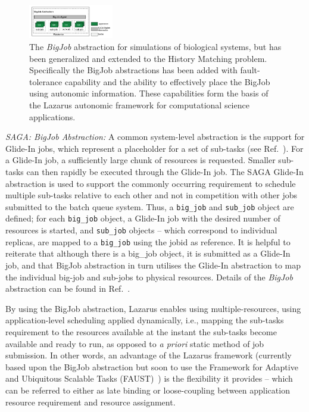 \documentclass{sig-alternate}
\newcommand{\up}{\vspace*{-0.3em}}
\begin{document}
\begin{figure}[t]
      \centering
      \includegraphics[width=0.330\textwidth]{./figures/enkf_bigjob.pdf}
      \caption{\footnotesize The {\it BigJob} abstraction for simulations of
        biological systems, but has been generalized and extended to
        the History Matching problem. Specifically the BigJob
        abstractions has been added with fault-tolerance capability
        and the ability to effectively place the BigJob using
        autonomic information. These capabilities form the basis of
        the Lazarus autonomic framework for computational science
        applications.}
      \label{fig:abstractions}\up\up\up \up\up\up
\end{figure}

{\it SAGA: BigJob Abstraction:} A common system-level abstraction is
the support for Glide-In jobs, which represent a placeholder for a
set of sub-tasks (see Ref.~\cite{saga_royalsoc}).  For a Glide-In
job, a sufficiently large chunk of resources is requested. Smaller
sub-tasks can then rapidly be executed through the Glide-In job.
The SAGA Glide-In abstraction is used to support the commonly
occurring requirement to schedule multiple sub-tasks relative to each
other and not in competition with other jobs submitted to the batch
queue system.  Thus, a \texttt{big\_job} and \texttt{sub\_job} object
are defined; for each \texttt{big\_job} object, a Glide-In job with
the desired number of resources is started, and \texttt{sub\_job}
objects -- which correspond to individual replicas, are mapped to a
\texttt{big\_job} using the jobid as reference. It is helpful to
reiterate that although there is a big\_job object, it is submitted as
a Glide-In job, and that BigJob abstraction in turn utilises the
Glide-In abstraction to map the individual big-job and sub-jobs to
physical resources.  Details of the \emph{BigJob} abstraction can be
found in Ref.~\cite{saga_royalsoc}.

By using the BigJob abstraction, Lazarus enables using multiple-resources, using application-level scheduling applied dynamically, i.e., mapping the sub-tasks requirement to the resources available at the instant the sub-tasks become available and ready to run, as opposed to {\it a priori} static method of job submission.  In other words, an advantage of the Lazarus framework (currently based upon the BigJob abstraction but soon to use the Framework for Adaptive and Ubiquitous Scalable Tasks (FAUST)~\cite{faust_url}) is the flexibility it provides -- which can be referred to either as late binding or loose-coupling between application resource requirement and resource assignment.
\end{document}
